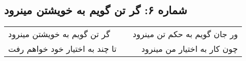 \begin{center}
\section*{شماره ۶: گر تن گویم به خویشتن مینرود}
\label{sec:006}
\begin{longtable}{l p{0.5cm} r}
گر تن گویم به خویشتن مینرود
&&
ور جان گویم به حکم تن مینرود
\\
تا چند به اختیار خود خواهم رفت
&&
چون کار به اختیار من مینرود
\\
\end{longtable}
\end{center}
